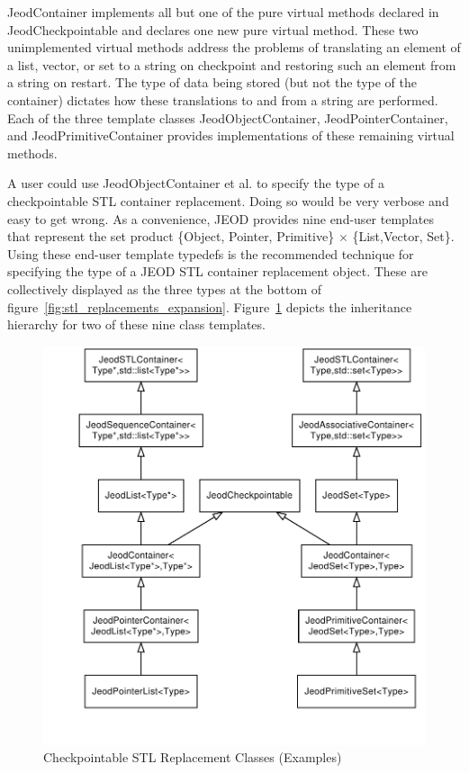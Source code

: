 JeodContainer implements all but one of the pure virtual methods
declared in JeodCheckpointable and declares one new pure virtual method.
These two unimplemented virtual methods address the problems of translating
an element of a list, vector, or set to a string on checkpoint
and restoring such an element from a string on restart.
The type of data being stored (but not the type of the container) dictates
how these translations to and from a string are performed. Each of the three
template classes JeodObjectContainer, JeodPointerContainer, and
JeodPrimitiveContainer provides implementations of these remaining
virtual methods.

A user could use JeodObjectContainer et al. to specify the type of a
checkpointable STL container replacement. Doing so would be very verbose and
easy to get wrong. As a convenience, JEOD provides nine end-user templates
that represent the set product
\{Object, Pointer, Primitive\} $\times$ \{List,Vector, Set\}.
Using these end-user template typedefs is the recommended technique for
specifying the type of a JEOD STL container replacement object. These
are collectively displayed as the three types at the bottom of
figure~\ref{fig:stl_replacements_expansion}. Figure~\ref{fig:stl_replacements_examples} depicts the inheritance
hierarchy for two of these nine class templates.

\begin{figure}[hbtp]
\centering
\includegraphics{stl_replacements_examples}
\caption{Checkpointable STL Replacement Classes (Examples)}
\label{fig:stl_replacements_examples}
\end{figure}

